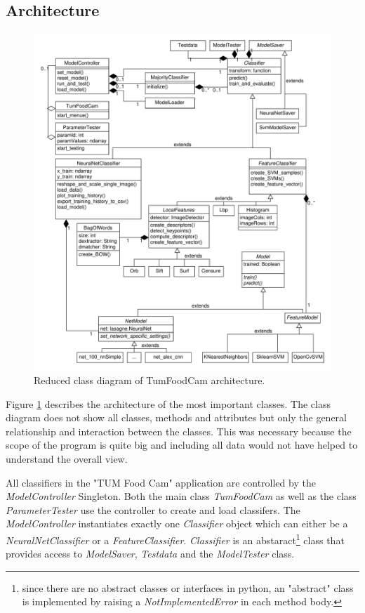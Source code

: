 	\subsection{Architecture}
	\begin{figure}
		\centering
		\includegraphics[width=\linewidth]{figures/implementation_classDiagram}
		
		\caption{Reduced class diagram of TumFoodCam architecture.}
		\label{fig:classDiagram}
	\end{figure}
	Figure \ref{fig:classDiagram} describes the architecture of the most important classes. The class diagram does not show all classes, methods and attributes but only the general relationship and interaction between the classes. This was necessary because the scope of the program is quite big and including all data would not have helped to understand the overall view.
	
	All classifiers in the "TUM Food Cam" application are controlled by the \textit{ModelController} Singleton. Both the main class \textit{TumFoodCam} as well as the class \textit{ParameterTester} use the controller to create and load classifers. The \textit{ModelController} instantiates exactly one \textit{Classifier} object which can either be a \textit{NeuralNetClassifier} or a \textit{FeatureClassifier}. \textit{Classifier} is an abstaract\footnote{since there are no abstract classes or interfaces in python, an "abstract" class is implemented by raising a \textit{NotImplementedError} in each method body.} class that provides access to \textit{ModelSaver},  \textit{Testdata} and the \textit{ModelTester} class.
	
